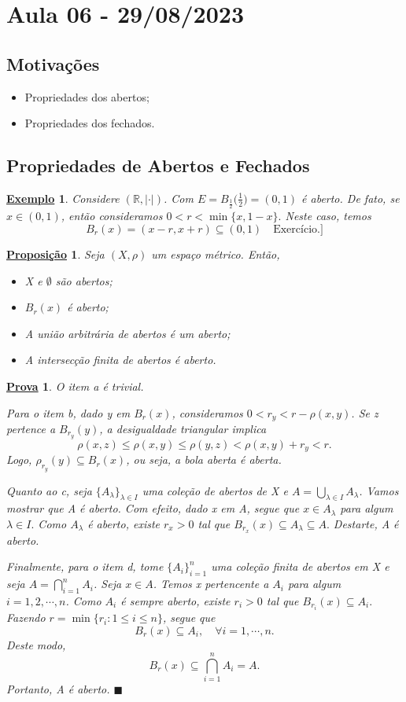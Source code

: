 \documentclass{article}
\newtheorem*{prop*}{\underline{Proposi\c c\~ao}}
\newtheorem{example}{\underline{Exemplo}}
\newtheorem*{proof*}{\underline{Prova}}
\renewcommand\qedsymbol{$\blacksquare$}
\begin{document}
\section{Aula 06 - 29/08/2023}
\subsection{Motivações}
\begin{itemize}
  \item Propriedades dos abertos;
  \item Propriedades dos fechados.
\end{itemize}
\subsection{Propriedades de Abertos e Fechados}
\begin{example}
  Considere \((\mathbb{R}, |\cdot |)\). Com \(E = B_{\frac{1}{2}}\biggl(\frac{1}{2}\biggr) = (0, 1)\) é aberto. De fato, se \(x\in(0, 1)\),
então consideramos \(0 < r < \min\{x, 1-x\}.\) Neste caso, temos 
  \[
    B_{r}(x) = (x-r, x+r)\subseteq{(0, 1)}\quad \text{Exercício.]}
  \]
\end{example}
\begin{prop*}
  Seja \((X, \rho )\) um espaço métrico. Então,
 \begin{itemize}
   \item[a)] X e \(\emptyset\) são abertos;
   \item[b)] \(B_{r}(x)\) é aberto;
   \item[c)] A união arbitrária de abertos é um aberto;
   \item[d)] A intersecção finita de abertos é aberto.
 \end{itemize}
\end{prop*}
\begin{proof*}
  O item a é trivial.

  Para o item b, dado y em \(B_{r}(x)\), consideramos \(0 < r_{y} < r - \rho (x, y)\). Se z pertence a \(B_{r_{y}}(y)\), a desigualdade triangular implica 
    \[
      \rho (x, z)\leq \rho (x, y)\leq \rho (y, z) < \rho (x, y) + r_{y} < r.
    \]
  Logo, \(\rho_{r_{y}}(y)\subseteq{B_{r}(x)}\), ou seja, a bola aberta é aberta.

  Quanto ao c, seja \(\{A_{\lambda }\}_{\lambda \in I}\) uma coleção de abertos de X e \(A = \bigcup_{\lambda \in I}^{}{A_{\lambda }}\). Vamos mostrar que A é aberto.
  Com efeito, dado x em A, segue que \(x\in A_{\lambda}\) para algum \(\lambda \in I.\) Como \(A_{\lambda }\) é aberto, existe \(r_{x} > 0\) tal que \(B_{r_{x}}(x)\subseteq{A_{\lambda}}\subseteq{A}.\)
  Destarte, A é aberto.

  Finalmente, para o item d, tome \(\{A_{i}\}_{i=1}^{n}\) uma coleção finita de abertos em X e seja \(A = \bigcap_{i=1}^{n}{A_{i}}\). Seja \(x\in A\). Temos x pertencente a \(A_{i}\) para algum \(i=1, 2, \cdots, n\).
Como \(A_{i}\) é sempre aberto, existe \(r_{i} > 0\) tal que \(B_{r_{i}}(x)\subseteq{A_{i}}.\) Fazendo \(r=\min\{r_{i}: 1\leq i\leq n\}\), segue que 
  \[
    B_{r}(x)\subseteq{A_{i}},\quad \forall i=1, \cdots, n.
  \]
Deste modo, 
  \[
    B_{r}(x)\subseteq{\bigcap_{i=1}^{n}{A_{i}}} = A.
  \]
  Portanto, A é aberto. \qedsymbol
\end{proof*}
\end{document}
